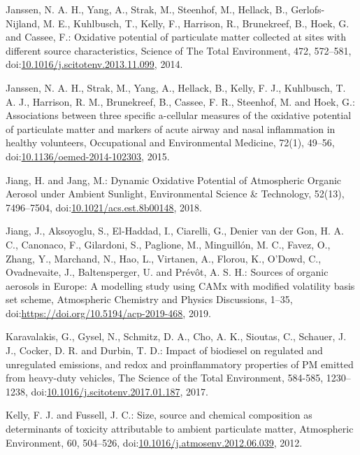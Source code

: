 \documentclass[
]{article}
\begin{document}
Janssen, N. A. H., Yang, A., Strak, M., Steenhof, M., Hellack, B.,
Gerlofs-Nijland, M. E., Kuhlbusch, T., Kelly, F., Harrison, R.,
Brunekreef, B., Hoek, G. and Cassee, F.: Oxidative potential of
particulate matter collected at sites with different source
characteristics, Science of The Total Environment, 472, 572--581,
doi:\href{https://doi.org/10.1016/j.scitotenv.2013.11.099}{10.1016/j.scitotenv.2013.11.099},
2014.

Janssen, N. A. H., Strak, M., Yang, A., Hellack, B., Kelly, F. J.,
Kuhlbusch, T. A. J., Harrison, R. M., Brunekreef, B., Cassee, F. R.,
Steenhof, M. and Hoek, G.: Associations between three specific
a-cellular measures of the oxidative potential of particulate matter and
markers of acute airway and nasal inflammation in healthy volunteers,
Occupational and Environmental Medicine, 72(1), 49--56,
doi:\href{https://doi.org/10.1136/oemed-2014-102303}{10.1136/oemed-2014-102303},
2015.

Jiang, H. and Jang, M.: Dynamic Oxidative Potential of Atmospheric
Organic Aerosol under Ambient Sunlight, Environmental Science \&
Technology, 52(13), 7496--7504,
doi:\href{https://doi.org/10.1021/acs.est.8b00148}{10.1021/acs.est.8b00148},
2018.

Jiang, J., Aksoyoglu, S., El-Haddad, I., Ciarelli, G., Denier van der
Gon, H. A. C., Canonaco, F., Gilardoni, S., Paglione, M., Minguillón, M.
C., Favez, O., Zhang, Y., Marchand, N., Hao, L., Virtanen, A., Florou,
K., O'Dowd, C., Ovadnevaite, J., Baltensperger, U. and Prévôt, A. S. H.:
Sources of organic aerosols in Europe: A modelling study using CAMx with
modified volatility basis set scheme, Atmospheric Chemistry and Physics
Discussions, 1--35,
doi:\href{https://doi.org/https://doi.org/10.5194/acp-2019-468}{https://doi.org/10.5194/acp-2019-468},
2019.

Karavalakis, G., Gysel, N., Schmitz, D. A., Cho, A. K., Sioutas, C.,
Schauer, J. J., Cocker, D. R. and Durbin, T. D.: Impact of biodiesel on
regulated and unregulated emissions, and redox and proinflammatory
properties of PM emitted from heavy-duty vehicles, The Science of the
Total Environment, 584-585, 1230--1238,
doi:\href{https://doi.org/10.1016/j.scitotenv.2017.01.187}{10.1016/j.scitotenv.2017.01.187},
2017.

Kelly, F. J. and Fussell, J. C.: Size, source and chemical composition
as determinants of toxicity attributable to ambient particulate matter,
Atmospheric Environment, 60, 504--526,
doi:\href{https://doi.org/10.1016/j.atmosenv.2012.06.039}{10.1016/j.atmosenv.2012.06.039},
2012.
\end{document}
